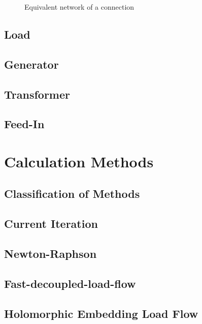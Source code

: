 \begin{figure}
	\centering
	
	\caption{Equivalent network of a connection}
	\label{fig:connection}
\end{figure}

\subsection{Load}

\subsection{Generator}

\subsection{Transformer}

\subsection{Feed-In}

\section{Calculation Methods}

\subsection{Classification of Methods}

\subsection{Current Iteration}
\label{sec:current_iteration}

\subsection{Newton-Raphson}
\label{sec:newton_raphson}

\subsection{Fast-decoupled-load-flow}
\label{sec:fdlf}

\subsection{Holomorphic Embedding Load Flow}
\label{sec:helm}

